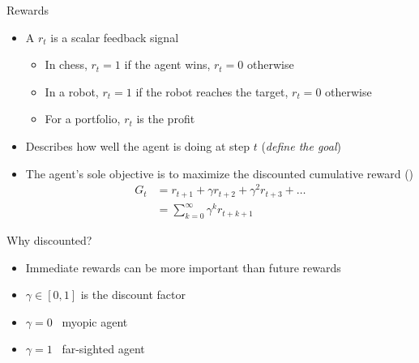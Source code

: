 \documentclass[presentation, 9pt]{beamer}\mode<presentation>{\usetheme{AMSBolognaFC}}
\begin{document}
\begin{frame}{Rewards}
\begin{itemize}
	\item A  $r_t$ is a scalar feedback signal
	\begin{itemize}
		\item In chess, $r_t = 1$ if the agent wins, $r_t = 0$ otherwise
		\item In a robot, $r_t = 1$ if the robot reaches the target, $r_t = 0$ otherwise
		\item For a portfolio, $r_t$ is the profit
	\end{itemize}
	\item Describes how well the agent is doing at step $t$ (\emph{define the goal})
	\item The agent's sole objective is to maximize the discounted cumulative reward ()
	\begin{equation*}
	\begin{split}
		G_t & = r_{t+1} + \gamma r_{t+2} + \gamma^2 r_{t+3} + \dots \\
		 & = \sum_{k=0}^{\infty} \gamma^k r_{t+k+1}
		\end{split}
	\end{equation*}
\end{itemize}
\begin{alertblock}{Why discounted?}
\begin{itemize}
	\item Immediate rewards can be more important than future rewards
	\item $\gamma \in [0,1]$ is the discount factor
	\item $\gamma = 0$ \faArrowRight \, myopic agent
	\item $\gamma = 1$ \faArrowRight \, far-sighted agent
\end{itemize}
\end{alertblock}
\end{frame}
\end{document}
